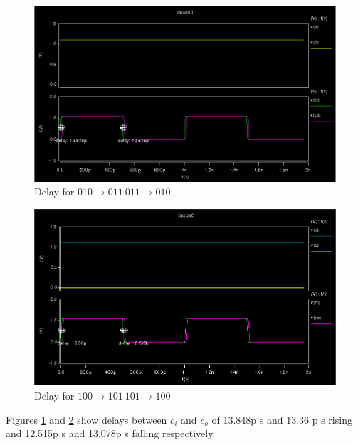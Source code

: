 \documentclass[12pt]{article}
\begin{document}
\begin{figure}[H]
\centering
\includegraphics[width=\linewidth]{010-011}
\caption{Delay for $010 \to 011\ 011 \to 010$}
\label{fig:010-011}
\end{figure}

\begin{figure}[H]
\centering
\includegraphics[width=1\linewidth]{100-101}
\caption{Delay for $100 \to 101 \ 101 \to 100$}
\label{fig:100-101}
\end{figure}

Figures \ref{fig:010-011} and \ref{fig:100-101} show delays between $c_i$ and $c_o$ of 13.848p s and 13.36 p s rising and 12.515p s and 13.078p s falling respectively.
\end{document}
